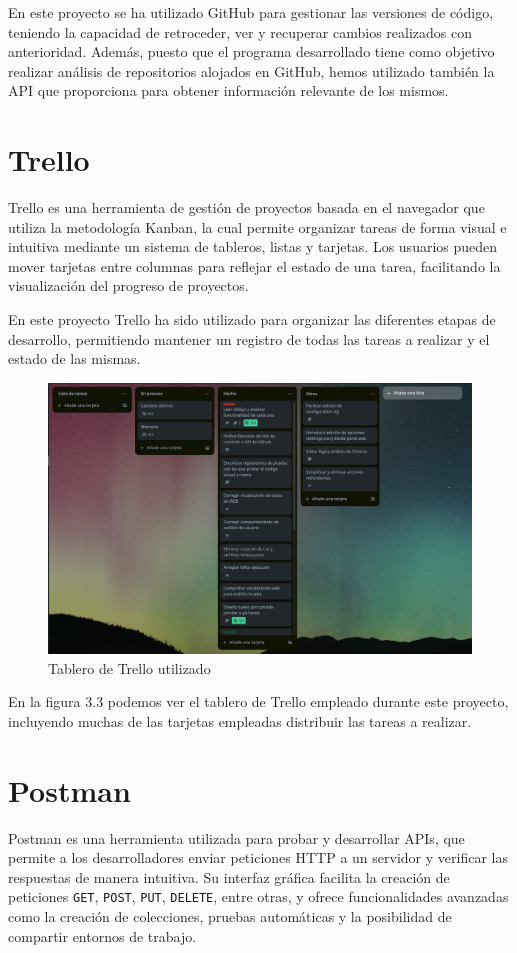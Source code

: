 \documentclass[a4paper, 12pt]{book}
\begin{document}
En este proyecto se ha utilizado GitHub para gestionar las versiones de código, teniendo la capacidad de retroceder, ver y recuperar cambios realizados con anterioridad. Además, puesto que el programa desarrollado tiene como objetivo realizar análisis de repositorios alojados en GitHub, hemos utilizado también la API que proporciona para obtener información relevante de los mismos.

\section{Trello}
Trello es una herramienta de gestión de proyectos basada en el navegador que utiliza la metodología Kanban, la cual permite organizar tareas de forma visual e intuitiva mediante un sistema de tableros, listas y tarjetas. Los usuarios pueden mover tarjetas entre columnas para reflejar el estado de una tarea, facilitando la visualización del progreso de proyectos.

En este proyecto Trello ha sido utilizado para organizar las diferentes etapas de desarrollo, permitiendo mantener un registro de todas las tareas a realizar y el estado de las mismas. 

\begin{figure} [H]
    \centering
    \includegraphics[width=\linewidth]{img/trello_example.png}
    \caption{Tablero de Trello utilizado}
    \label{fig:trello_example}
\end{figure}

En la figura 3.3 podemos ver el tablero de Trello empleado durante este proyecto, incluyendo muchas de las tarjetas empleadas distribuir las tareas a realizar.

\section{Postman} 
Postman \cite{postman_api_documentation} es una herramienta utilizada para probar y desarrollar APIs, que permite a los desarrolladores enviar peticiones HTTP a un servidor y verificar las respuestas de manera intuitiva. Su interfaz gráfica facilita la creación de peticiones \texttt{GET}, \texttt{POST}, \texttt{PUT}, \texttt{DELETE}, entre otras, y ofrece funcionalidades avanzadas como la creación de colecciones, pruebas automáticas y la posibilidad de compartir entornos de trabajo.
\end{document}
